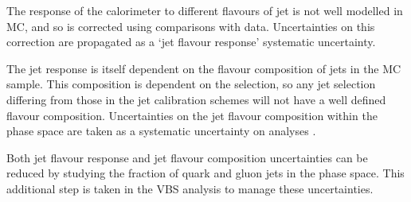 The response of the calorimeter to different flavours of jet is not well
modelled in \ac{MC}, and so is corrected using comparisons with data.
Uncertainties on this correction are propagated as a `jet flavour response'
systematic uncertainty.

The jet response is itself dependent on the flavour composition of jets in the
\ac{MC} sample. This composition is dependent on the selection, so any jet
selection differing from those in the jet calibration schemes will not have a
well defined flavour composition. Uncertainties on the jet flavour composition
within the phase space are taken as a systematic uncertainty on analyses
\cite{JetFlavourUncerts2011}.

Both jet flavour response and jet flavour composition uncertainties can be
reduced by studying the fraction of quark and gluon jets in the phase space.
This additional step is taken in the \ac{VBS} analysis to manage these
uncertainties.


